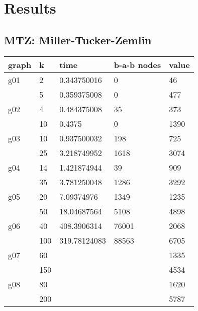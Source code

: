 
\section{Results}

\subsection{MTZ: Miller-Tucker-Zemlin}
\begin{tabular}{l l l l l}
graph	&	k	&	time	&	b-a-b nodes &	value	\\ \hline
g01	&	2	&	0.343750016	&	0			&	46	\\
	&	5	&	0.359375008	&	0			&	477	\\ \hline
g02	&	4	&	0.484375008	&	35			&	373	\\
	&	10	&	0.4375		&	0			&	1390	\\ \hline
g03	&	10	&	0.937500032	&	198			&	725	\\
	&	25	&	3.218749952	&	1618		&	3074	\\ \hline
g04	&	14	&	1.421874944	&	39			&	909	\\
	&	35	&	3.781250048	&	1286		&	3292	\\ \hline
g05	&	20	&	7.09374976	&	1349		&	1235	\\
	&	50	&	18.04687564	&	5108		&	4898	\\ \hline
g06	&	40	&	408.3906314	&	76001		&	2068	\\
	&	100	&	319.78124083&	88563		&	6705	\\ \hline
g07	&	60	&				&		&	1335	\\
	&	150	&				&		&	4534	\\ \hline
g08	&	80	&				&		&	1620	\\
	&	200	&				&		&	5787	\\ \hline
\end{tabular}

